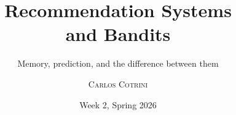 \documentclass[aspectratio=169,11pt]{beamer}
\title{Recommendation Systems\\and Bandits}
\subtitle{Memory, prediction, and the difference between them}
\author{\textsc{Carlos Cotrini}}
\institute{ETH Zürich \,|\, AI in Industry}
\date{Week 2, Spring 2026}
\renewcommand{\AINITshorttitle}{Recsys and Bandits}
\begin{document}






\appendix
\renewcommand{\AINITshorttitle}{Recsys and Bandits, references}

\end{document}
